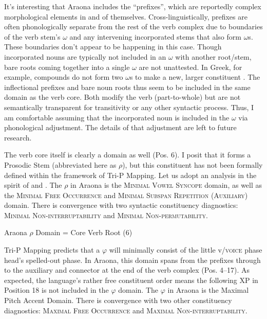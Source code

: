 \documentclass[output=paper]{langscibook}
\begin{document}
It's interesting that Araona includes the ``prefixes'', which are reportedly complex morphological elements in and of themselves. Cross-linguistically, prefixes are often phonologically separate from the rest of the verb complex due to boundaries of the verb stem's $\omega$ and any intervening incorporated stems that also form $\omega$s. These boundaries don't appear to be happening in this case. Though incorporated nouns are typically not included in an $\omega$ with another root/stem, bare roots coming together into a single $\omega$ are not unattested. In Greek, for example, compounds do not form two $\omega$s to make a new, larger constituent \citep{athanasopoulou:2014}. The inflectional prefixes and bare noun roots thus seem to be included in the same domain as the verb core. Both modify the verb (part-to-whole) but are not semantically transparent for transitivity or any other syntactic process. Thus, I am comfortable assuming that the incorporated noun is included in the $\omega$ via phonological adjustment. The details of that adjustment are left to future research. %

The verb core itself is clearly a domain as well (Pos. 6). I posit that it forms a Prosodic Stem (abbreviated here as $\rho$), but this constituent has not been formally defined within the framework of Tri-P Mapping. Let us adopt an analysis in the spirit of \citet{downing:2015} and \citet{downing:2020}. The $\rho$ in Araona is the {\textsc{Minimal Vowel Syncope}} domain, as well as the {\textsc{Minimal Free Occurrence}} and {\textsc{Minimal Subspan Repetition (Auxiliary)}} domain. There is convergence with two syntactic constituency diagnostics: {\textsc{Minimal Non-interrup\-tability}} and {\textsc{Minimal Non-permutability}}.

\ea
 \label{AraonaPStem} Araona $\rho$ Domain = Core Verb Root (6) \\ 
\z

Tri-P Mapping predicts that a $\varphi$ will minimally consist of the little v/{\textsc{voice}} phase head's spelled-out phase. In Araona, this domain spans from the prefixes through to the auxiliary and connector at the end of the verb complex (Pos. 4--17). As expected, the language's rather free constituent order means the following XP in Position 18 is not included in the $\varphi$ domain. The $\varphi$ in Araona is the Maximal Pitch Accent Domain. There is convergence with two other constituency diagnostics: {\textsc{Maximal Free Occurrence}} and {\textsc{Maximal Non-interruptability}}.
\end{document}
